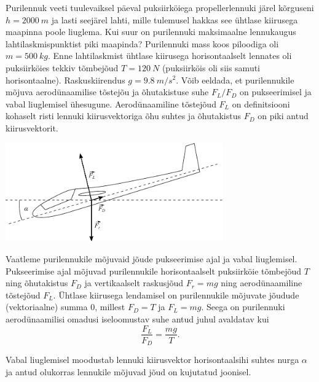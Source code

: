 \setAuthor{}

Purilennuk veeti tuulevaiksel päeval puksiirköiega propellerlennuki järel kõrguseni $h = \SI{2000}{m}$ ja lasti seejärel lahti, mille tulemusel hakkas see ühtlase kiirusega maapinna poole liuglema. Kui suur on purilennuki maksimaalne lennukaugus lahtilaskmispunktist piki maapinda? Purilennuki mass koos piloodiga oli $m = \SI{500}{kg}$. Enne lahtilaskmist ühtlase kiirusega horisontaalselt lennates oli puksiirköies tekkiv tõmbejõud $T = \SI{120}{N}$ (puksiirköis oli siis samuti horisontaalne). Raskuskiirendus $g = \SI{9.8}{m/s^2}$. Võib eeldada, et purilennukile mõjuva aerodünaamilise tõstejõu ja õhutakistuse suhe $F_L/F_D$ on pukseerimisel ja vabal liuglemisel ühesugune. Aerodünaamiline tõstejõud $F_L$ on definitsiooni kohaselt risti lennuki kiirusvektoriga õhu suhtes ja õhutakistus $F_D$ on piki antud kiirusvektorit. 


\hint

\solu
\begin{center}
	\vspace{-30pt}
  \includegraphics[width=0.7\textwidth]{2020-v2g-05-sol.pdf}
\end{center}


Vaatleme purilennukile mõjuvaid jõude pukseerimise ajal ja vabal liuglemisel. Pukseerimise ajal mõjuvad purilennukile horisontaalselt puksiirköie tõmbejõud $T$ ning õhutakistus $F_D$ ja vertikaalselt raskusjõud $F_r = mg$ ning aerodünaamiline tõstejõud $F_L$. Ühtlase kiirusega lendamisel on purilennukile mõjuvate jõudude (vektoriaalne) summa 0, millest $F_D = T$ ja $F_L = mg$. Seega on purilennuki aerodünaamilisi omadusi iseloomustav suhe antud juhul avaldatav kui
\begin{equation}
	\frac{F_L}{F_D} = \frac{mg}{T}.
\end{equation}

Vabal liuglemisel moodustab lennuki kiirusvektor horisontaalsihi suhtes nurga $\alpha$ ja antud olukorras lennukile mõjuvad jõud on kujutatud joonisel.


